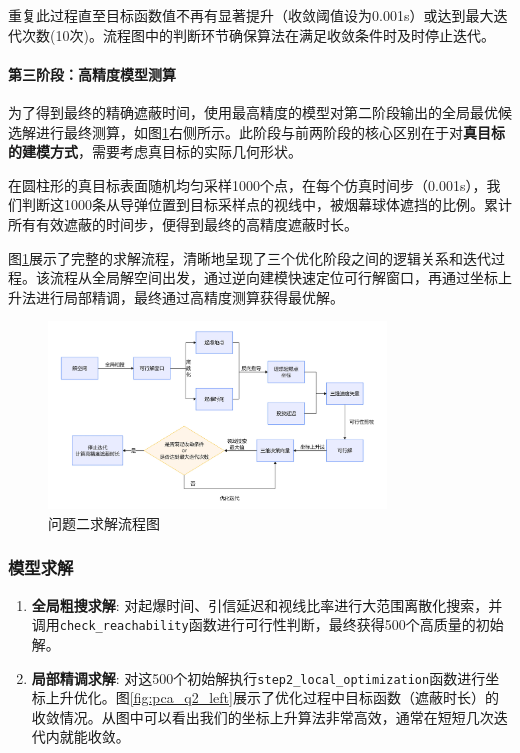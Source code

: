 \documentclass[12pt]{article}
\newcommand{\code}[1]{\texttt{#1}} %
\begin{document}
\begin{CJK}{UTF8}{gbsn}
		重复此过程直至目标函数值不再有显著提升（收敛阈值设为0.001s）或达到最大迭代次数(10次)。流程图中的判断环节确保算法在满足收敛条件时及时停止迭代。
		
		\paragraph{第三阶段：高精度模型测算}
		为了得到最终的精确遮蔽时间，使用最高精度的模型对第二阶段输出的全局最优候选解进行最终测算，如图\ref{fig:flowchart_q2}右侧所示。此阶段与前两阶段的核心区别在于对\textbf{真目标的建模方式}，需要考虑真目标的实际几何形状。
		
		在圆柱形的真目标表面随机均匀采样1000个点，在每个仿真时间步（0.001s），我们判断这1000条从导弹位置到目标采样点的视线中，被烟幕球体遮挡的比例。累计所有有效遮蔽的时间步，便得到最终的高精度遮蔽时长。
		
		图\ref{fig:flowchart_q2}展示了完整的求解流程，清晰地呈现了三个优化阶段之间的逻辑关系和迭代过程。该流程从全局解空间出发，通过逆向建模快速定位可行解窗口，再通过坐标上升法进行局部精调，最终通过高精度测算获得最优解。
		
		
		\begin{figure}[H]
			\centering
			\includegraphics[width=0.8\textwidth]{pic/Fg6-Pb2.jpg}
			\caption{问题二求解流程图}
			\label{fig:flowchart_q2}
		\end{figure}
		
		\subsubsection{模型求解}
		\begin{enumerate}
			\item \textbf{全局粗搜求解}: 对起爆时间、引信延迟和视线比率进行大范围离散化搜索，并调用\code{check\_reachability}函数进行可行性判断，最终获得500个高质量的初始解。
			
			\item \textbf{局部精调求解}: 对这500个初始解执行\code{step2\_local\_optimization}函数进行坐标上升优化。图\ref{fig:pca_q2_left}展示了优化过程中目标函数（遮蔽时长）的收敛情况。从图中可以看出我们的坐标上升算法非常高效，通常在短短几次迭代内就能收敛。
			

\end{enumerate}
\end{CJK}
\end{document}
